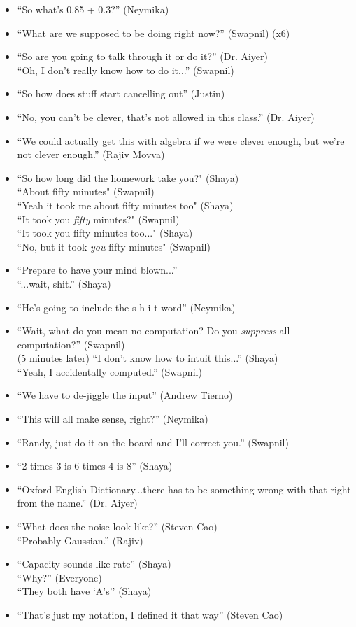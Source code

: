 \documentclass[11pt]{article}
\theoremstyle{definition}
\begin{document}
\begin{itemize}
\item ``So what's 0.85 + 0.3?'' (Neymika)
\item ``What are we supposed to be doing right now?'' (Swapnil) (x6)
\item ``So are you going to talk through it or do it?'' (Dr. Aiyer) \\ ``Oh, I don't really know how to do it...'' (Swapnil)
\item ``So how does stuff start cancelling out'' (Justin)
\item ``No, you can't be clever, that's not allowed in this class.'' (Dr. Aiyer)
\item ``We could actually get this with algebra if we were clever enough, but we’re not clever enough.'' (Rajiv Movva)
\item ``So how long did the homework take you?" (Shaya) \\ ``About fifty minutes" (Swapnil) \\ ``Yeah it took me about fifty minutes too" (Shaya) \\ ``It took you \textit{fifty} minutes?" (Swapnil) \\ ``It took you fifty minutes too..." (Shaya) \\ ``No, but it took \textit{you} fifty minutes" (Swapnil)
\item ``Prepare to have your mind blown...'' \\ ``...wait, shit.'' (Shaya)
\item ``He's going to include the s-h-i-t word'' (Neymika)
\item ``Wait, what do you mean no computation? Do you \textit{suppress} all computation?'' (Swapnil) \\ (5 minutes later) ``I don't know how to intuit this...'' (Shaya) \\ ``Yeah, I accidentally computed.'' (Swapnil)
\item ``We have to de-jiggle the input'' (Andrew Tierno) 
\item ``This will all make sense, right?'' (Neymika) 
\item ``Randy, just do it on the board and I'll correct you.'' (Swapnil)
\item ``2 times 3 is 6 times 4 is 8'' (Shaya)
\item ``Oxford English Dictionary...there has to be something wrong with that right from the name.'' (Dr. Aiyer)
\item ``What does the noise look like?'' (Steven Cao) \\ ``Probably Gaussian.'' (Rajiv)
\item ``Capacity sounds like rate'' (Shaya) \\ ``Why?'' (Everyone) \\ ``They both have `A's'' (Shaya)
\item ``That's just my notation, I defined it that way'' (Steven Cao)
\end{itemize}
\end{document}
